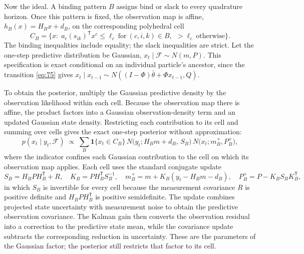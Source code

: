 \documentclass[11pt]{article}
\begin{document}
Now the ideal. A binding pattern \(B\) assigns bind or slack to every quadrature horizon. Once this pattern is fixed, the observation map is affine, \(h_B(x)=H_Bx+d_B\), on the corresponding polyhedral cell
\begin{equation}\label{eq:83}
 C_B=\bigl\{x:\;a_c(s_{ik})^{\mathsf T}x^c\leq\ell_c\ \text{for}\
 (c,i,k)\in B,\ \ >\ell_c\ \text{otherwise}\bigr\}.
\end{equation}
The binding inequalities include equality; the slack inequalities are strict. Let the one-step predictive distribution be Gaussian, \(x_t\mid\mathcal F\sim N(m,P)\). This specification is exact conditional on an individual particle's ancestor, since the transition \eqref{eq:75} gives \(x_t\mid x_{t-1}\sim N((I-\Phi)\bar\theta+\Phi x_{t-1},Q)\).

To obtain the posterior, multiply the Gaussian predictive density by the observation likelihood within each cell. Because the observation map there is affine, the product factors into a Gaussian observation-density term and an updated Gaussian state density. Restricting each contribution to its cell and summing over cells gives the exact one-step posterior without approximation:
\begin{equation}\label{eq:84}
 p(x_t\mid y_t,\mathcal F)\;\propto\;
 \sum_{B}\mathbf 1\{x_t\in C_B\}\,
 N\!\bigl(y_t;H_Bm+d_B,\,S_B\bigr)\,
 N\!\bigl(x_t;m_B^+,P_B^+\bigr),
\end{equation}
where the indicator confines each Gaussian contribution to the cell on which its observation map applies. Each cell uses the standard conjugate update
\begin{equation}\label{eq:85}
 S_B=H_BPH_B^{\mathsf T}+R,\quad
 K_B=PH_B^{\mathsf T}S_B^{-1},\quad
 m_B^+=m+K_B(y_t-H_Bm-d_B),\quad
 P_B^+=P-K_BS_BK_B^{\mathsf T},
\end{equation}
in which \(S_B\) is invertible for every cell because the measurement covariance \(R\) is positive definite and \(H_BPH_B^{\mathsf T}\) is positive semidefinite. The update combines projected state uncertainty with measurement noise to obtain the predictive observation covariance. The Kalman gain then converts the observation residual into a correction to the predictive state mean, while the covariance update subtracts the corresponding reduction in uncertainty. These are the parameters of the Gaussian factor; the posterior still restricts that factor to its cell.
\end{document}
